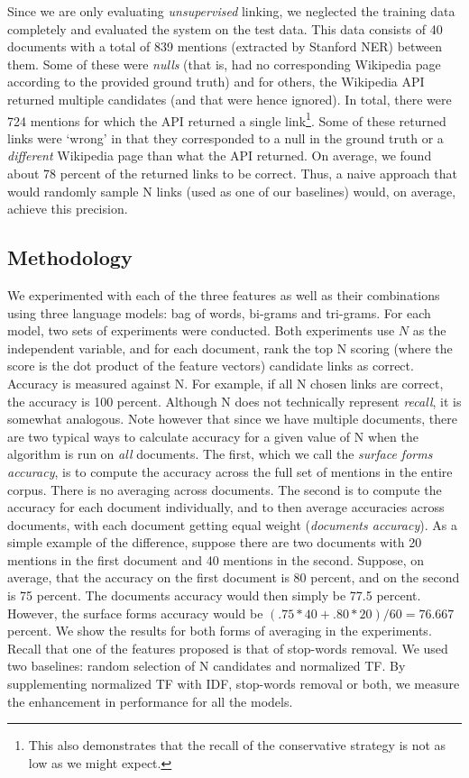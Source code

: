 \documentclass[runningheads,a4paper]{llncs}
\begin{document}
Since we are only evaluating \emph{unsupervised} linking, we neglected the training data completely and evaluated the system on the test data. This data consists of 40 documents with a total of 839 mentions (extracted by Stanford NER) between them. Some of these were \emph{nulls} (that is, had no corresponding Wikipedia page according to the provided ground truth) and for others, the Wikipedia API returned multiple candidates (and that were hence ignored). In total, there were 724 mentions for which the API returned a single link\footnote{This also demonstrates that the recall of the conservative strategy is not as low as we might expect.}. Some of these returned links were `wrong' in that they corresponded to a null in the ground truth or a \emph{different} Wikipedia page than what the API returned. On average, we found about 78 percent of the returned links to be correct. Thus, a naive approach that would randomly sample N links (used as one of our baselines) would, on average, achieve this precision.   
\subsection{Methodology}
We experimented with each of the three features as well as their combinations using three language models: bag of words, bi-grams and tri-grams. For each model, two sets of experiments were conducted. Both experiments use $N$ as the independent variable, and for each document, rank the top N scoring (where the score is the dot product of the feature vectors) candidate links as correct. Accuracy is measured against N. For example, if all N chosen links are correct, the accuracy is 100 percent. Although N does not technically represent \emph{recall}, it is somewhat analogous. Note however that since we have multiple documents, there are two typical ways to calculate accuracy for a given value of N when the algorithm is run on \emph{all} documents. The first, which we call the \emph{surface forms accuracy}, is to compute the accuracy across the full set of mentions in the entire corpus. There is no averaging across documents. The second is to compute the accuracy for each document individually, and to then average accuracies across documents, with each document getting equal weight (\emph{documents accuracy}). As a simple example of the difference, suppose there are two documents with 20 mentions in the first document and 40 mentions in the second. Suppose, on average, that the accuracy on the first document is 80 percent, and on the second is 75 percent. The documents accuracy would then simply be 77.5 percent. However, the surface forms accuracy would be $(.75*40+.80*20)/60=76.667$ percent. We show the results for both forms of averaging in the experiments.
Recall that one of the features proposed is that of stop-words removal. We used two baselines: random selection of N candidates and normalized TF. By supplementing normalized TF with IDF, stop-words removal or both, we measure the enhancement in performance for all the models.
\end{document}
